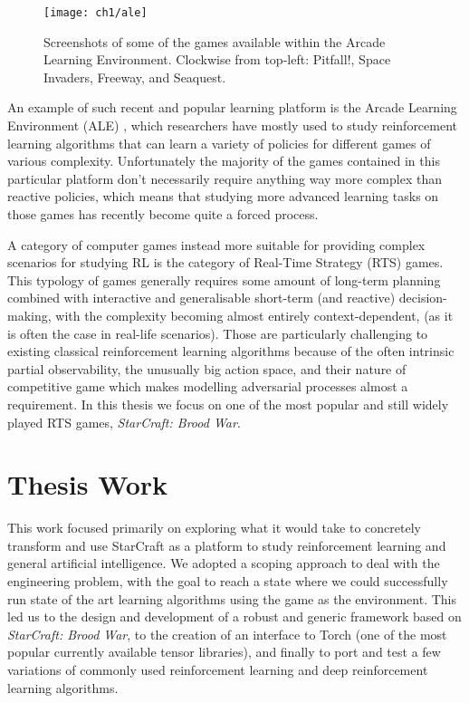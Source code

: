 \begin{figure}[h]
    \centering
    \texttt{[image: ch1/ale]}
    \caption{Screenshots of some of the games available within the Arcade
      Learning Environment. Clockwise from top-left: Pitfall!, Space Invaders,
      Freeway, and Seaquest.}
    \label{fig:ALE}
\end{figure}

An example of such recent and popular learning platform is the Arcade Learning
Environment (ALE) \citep{bellemare2012arcade}, which researchers have mostly
used to study reinforcement learning algorithms that can learn a variety of
policies for different games of various complexity. Unfortunately the majority
of the games contained in this particular platform don't necessarily require
anything way more complex than reactive policies, which means that studying more
advanced learning tasks on those games has recently become quite a forced
process.

A category of computer games instead more suitable for providing complex
scenarios for studying RL is the category of Real-Time Strategy (RTS) games.
This typology of games generally requires some amount of long-term planning
combined with interactive and generalisable short-term (and reactive)
decision-making, with the complexity becoming almost entirely context-dependent,
(as it is often the case in real-life scenarios). Those are particularly
challenging to existing classical reinforcement learning algorithms because of
the often intrinsic partial observability, the unusually big action space, and
their nature of competitive game which makes modelling adversarial processes
almost a requirement. In this thesis we focus on one of the most popular and
still widely played RTS games, \emph{StarCraft: Brood War}.


\section{Thesis Work}

This work focused primarily on exploring what it would take to concretely
transform and use StarCraft as a platform to study reinforcement learning and
general artificial intelligence. We adopted a scoping approach to deal with the
engineering problem, with the goal to reach a state where we could successfully
run state of the art learning algorithms using the game as the environment. This
led us to the design and development of a robust and generic framework based on
\emph{StarCraft: Brood War}, to the creation of an interface to Torch (one of
the most popular currently available tensor libraries), and finally to port and
test a few variations of commonly used reinforcement learning and deep
reinforcement learning algorithms.


